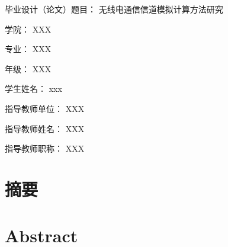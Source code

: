 
\begin{titlepage}
\pagenumbering{}	%
\songti{}	%

毕业设计（论文）题目：	无线电通信信道模拟计算方法研究

学院：	XXX

专业：	XXX

年级：	XXX

学生姓名：	xxx

指导教师单位：	XXX

指导教师姓名：	XXX

指导教师职称：	XXX

\end{titlepage}


\maketitle

\frontmatter	%



\chapter[中文摘要]{摘要}

\chapter[英文摘要]{Abstract}




\thispagestyle{empty}

\mainmatter		%

\newpage


